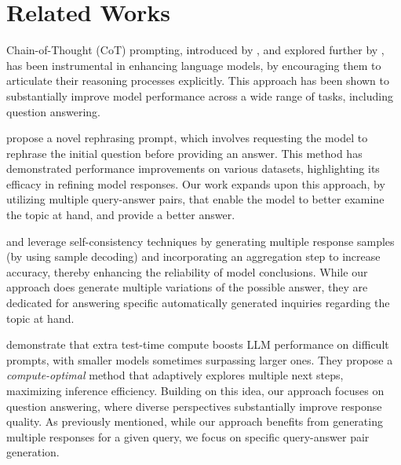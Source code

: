 \section{Related Works}
\label{sec:related-works}

Chain-of-Thought (CoT) prompting, introduced by \citet{wu-etal-2023-chain}, and explored further by \citet{weiChainofThoughtPromptingElicits2023}, has been instrumental in enhancing language models, by encouraging them to articulate their reasoning processes explicitly. This approach has been shown to substantially improve model performance across a wide range of tasks, including question answering. 

\citet{dengRephraseRespondLet2024} propose a novel rephrasing prompt, which involves requesting the model to rephrase the initial question before providing an answer. This method has demonstrated performance improvements on various datasets, highlighting its efficacy in refining model responses. Our work expands upon this approach, by utilizing multiple query-answer pairs, that enable the model to better examine the topic at hand, and provide a better answer.

\citet{wangSelfConsistencyImprovesChain2023} and \citet{chenUniversalSelfConsistencyLarge2023} leverage self-consistency techniques by generating multiple response samples (by using sample decoding) and incorporating an aggregation step to increase accuracy, thereby enhancing the reliability of model conclusions. While our approach does generate multiple variations of the possible answer, they are dedicated for answering specific automatically generated inquiries regarding the topic at hand.

\citet{snellScalingLLMTestTime2024} demonstrate that extra test-time compute boosts LLM performance on difficult prompts, with smaller models sometimes surpassing larger ones. They propose a \textit{compute-optimal} method that adaptively explores multiple next steps, maximizing inference efficiency. Building on this idea, our approach focuses on question answering, where diverse perspectives substantially improve response quality. As previously mentioned, while our approach benefits from generating multiple responses for a given query, we focus on specific query-answer pair generation.